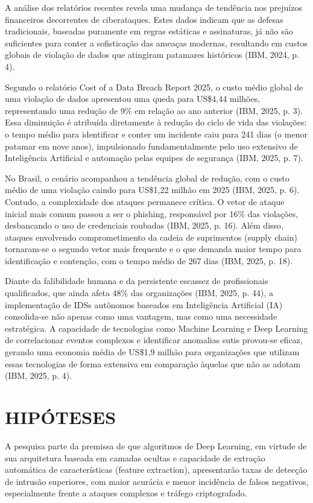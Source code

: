 \documentclass[12pt,oneside]{abntex2}
\begin{document}
A análise dos relatórios recentes revela uma mudança de tendência nos prejuízos financeiros decorrentes de ciberataques. Estes dados indicam que as defesas tradicionais, baseadas puramente em regras estáticas e assinaturas, já não são suficientes para conter a sofisticação das ameaças modernas, resultando em custos globais de violação de dados que atingiram patamares históricos (IBM, 2024, p. 4).

Segundo o relatório Cost of a Data Breach Report 2025, o custo médio global de uma violação de dados apresentou uma queda para US\$4,44 milhões, representando uma redução de 9\% em relação ao ano anterior (IBM, 2025, p. 3). Essa diminuição é atribuída diretamente à redução do ciclo de vida das violações: o tempo médio para identificar e conter um incidente caiu para 241 dias (o menor patamar em nove anos), impulsionado fundamentalmente pelo uso extensivo de Inteligência Artificial e automação pelas equipes de segurança (IBM, 2025, p. 7).

No Brasil, o cenário acompanhou a tendência global de redução, com o custo médio de uma violação caindo para US\$1,22 milhão em 2025 (IBM, 2025, p. 6). Contudo, a complexidade dos ataques permanece crítica. O vetor de ataque inicial mais comum passou a ser o phishing, responsável por 16\% das violações, desbancando o uso de credenciais roubadas (IBM, 2025, p. 16). Além disso, ataques envolvendo comprometimento da cadeia de suprimentos (supply chain) tornaram-se o segundo vetor mais frequente e o que demanda maior tempo para identificação e contenção, com o tempo médio de 267 dias (IBM, 2025, p. 18).

Diante da falibilidade humana e da persistente escassez de profissionais qualificados, que ainda afeta 48\% das organizações (IBM, 2025, p. 44), a implementação de IDSs autônomos baseados em Inteligência Artificial (IA) consolida-se não apenas como uma vantagem, mas como uma necessidade estratégica. A capacidade de tecnologias como Machine Learning e Deep Learning de correlacionar eventos complexos e identificar anomalias sutis provou-se eficaz, gerando uma economia média de US\$1,9 milhão para organizações que utilizam essas tecnologias de forma extensiva em comparação àquelas que não as adotam (IBM, 2025, p. 4).

\section{HIPÓTESES}

A pesquisa parte da premissa de que algoritmos de Deep Learning, em virtude de sua arquitetura baseada em camadas ocultas e capacidade de extração automática de características (feature extraction), apresentarão taxas de detecção de intrusão superiores, com maior acurácia e menor incidência de falsos negativos, especialmente frente a ataques complexos e tráfego criptografado.
\end{document}

